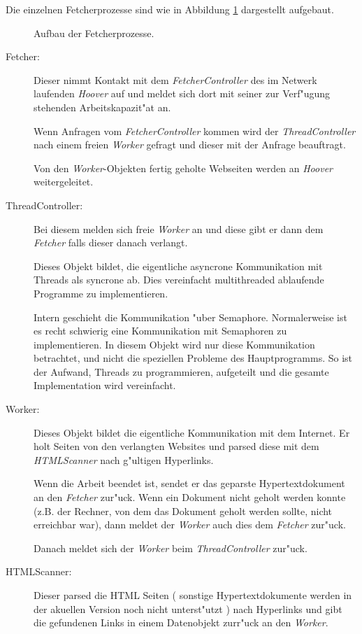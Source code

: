 Die einzelnen Fetcherprozesse sind wie in Abbildung \ref{FetcherErsterUeberblick} dargestellt aufgebaut.
 
\begin{figure}[t]
	\caption{Aufbau der Fetcherprozesse.}
	\label{FetcherErsterUeberblick}
\end{figure}

\begin{description}


\item[Fetcher:]	Dieser nimmt Kontakt mit dem {\em FetcherController} des im Netwerk laufenden {\em Hoover} auf und meldet sich dort mit seiner zur Verf"ugung stehenden Arbeitskapazit"at an.

Wenn Anfragen vom {\em FetcherController} kommen wird der {\em ThreadController} nach einem freien {\em Worker} gefragt und dieser mit der Anfrage beauftragt.

Von den {\em Worker}-Objekten fertig geholte Webseiten werden an {\em Hoover} weitergeleitet.

\item[ThreadController:]	Bei diesem melden sich freie {\em Worker} an und diese gibt er dann dem {\em Fetcher} falls dieser danach verlangt. 

Dieses Objekt bildet, die eigentliche asyncrone Kommunikation mit Threads als syncrone ab. Dies vereinfacht multithreaded ablaufende Programme zu implementieren.

Intern geschieht die Kommunikation "uber Semaphore. Normalerweise ist es recht schwierig eine Kommunikation mit Semaphoren zu implementieren. In diesem Objekt wird nur diese Kommunikation betrachtet, und nicht die speziellen Probleme des Hauptprogramms. So ist der Aufwand, Threads zu programmieren, aufgeteilt und die gesamte Implementation wird vereinfacht.


\item[Worker:]	Dieses Objekt bildet die eigentliche Kommunikation mit dem Internet. Er holt Seiten von den verlangten Websites und parsed diese mit dem {\em HTMLScanner} nach g"ultigen Hyperlinks. 

Wenn die Arbeit beendet ist, sendet er das geparste Hypertextdokument an den {\em Fetcher} zur"uck. Wenn ein Dokument nicht geholt werden konnte (z.B. der Rechner, von dem das Dokument geholt werden sollte, nicht erreichbar war), dann meldet der {\em Worker} auch dies dem {\em Fetcher} zur"uck.

Danach meldet sich der {\em Worker} beim {\em ThreadController} zur"uck.

\item[HTMLScanner:] Dieser parsed die HTML Seiten ( sonstige Hypertextdokumente werden in der akuellen Version noch nicht unterst"utzt ) nach Hyperlinks und gibt die gefundenen Links in einem Datenobjekt zurr"uck an den {\em Worker}.

\end{description}


